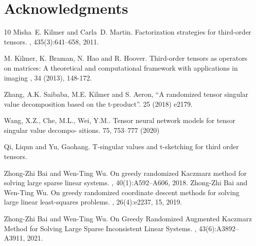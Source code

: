 \documentclass[11pt]{article}
\begin{document}
\section*{Acknowledgments}

{\small 
%
%


\begin{thebibliography}{10}
Misha~E. Kilmer and Carla~D. Martin.
\newblock Factorization strategies for third-order tensors.
, 435(3):641--658, 2011.

M. Kilmer, K. Braman, N. Hao and R. Hoover.
\newblock Third-order tensors as operators
on matrices: A theoretical and computational framework with applications in
imaging
, 34 (2013), 148-172.


Zhang, A.K. Saibaba, M.E. Kilmer and S. Aeron, 
\newblock “A randomized tensor singular
value decomposition based on the t-product”.
 25 (2018) e2179.

Wang, X.Z., Che, M.L., Wei, Y.M..
\newblock Tensor neural network models for tensor singular value decompo-
sitions. 
 75, 753–777 (2020)

Qi, Liqun and Yu, Gaohang.
\newblock T-singular values and t-sketching for third order tensors.


Zhong-Zhi Bai and Wen-Ting Wu.
\newblock On greedy randomized {K}aczmarz method for solving large sparse
  linear systems.
, 40(1):A592--A606, 2018.
Zhong-Zhi Bai and Wen-Ting Wu.
\newblock On greedy randomized coordinate descent methods for solving large
  linear least-squares problems.
, 26(4):e2237, 15, 2019.

Zhong-Zhi Bai and Wen-Ting Wu.
\newblock On {G}reedy {R}andomized {A}ugmented {K}aczmarz {M}ethod for
  {S}olving {L}arge {S}parse {I}nconsistent {L}inear {S}ystems.
, 43(6):A3892--A3911, 2021.


\end{thebibliography}}
\end{document}
